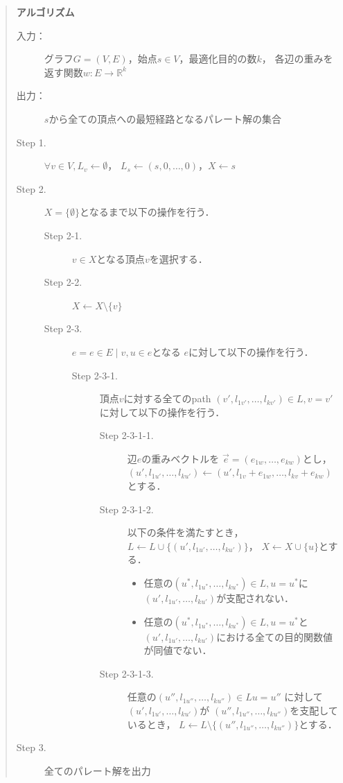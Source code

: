 \documentclass[12pt]{optlab-bachelor}
\begin{document}
\begin{quote}
  \textbf{アルゴリズム}
  \begin{description}
    \item[入力：] グラフ$G=(V,E)$，始点$s \in V$，最適化目的の数$k$，
    各辺の重みを返す関数$w : E \to \mathbb{R}^k$
    \item[出力：] $s$から全ての頂点への最短経路となるパレート解の集合
    \item[Step 1.] $\forall v \in V , L_v \leftarrow \emptyset$，
    $L_s \leftarrow (s,0,\ldots,0)$，$X \leftarrow s$
    \item[Step 2.] $X = \{\emptyset\}$となるまで以下の操作を行う．
    \begin{description}
      \item[Step 2-1.] $v \in X$となる頂点$v$を選択する．
      \item[Step 2-2.] $X \leftarrow X \setminus \{ v \}$
      \item[Step 2-3.] $e = {e \in E \mid v,u \in e}$となる
      $e$に対して以下の操作を行う．
      \begin{description}
        \item[Step 2-3-1.] 頂点$v$に対する全てのpath
        $(v',l_{1v'},\ldots,l_{kv'}) \in L,v=v'$に対して以下の操作を行う．
        \begin{description}
          \item[Step 2-3-1-1.] 辺$e$の重みベクトルを
          $\vec{e} = (e_{1w},\ldots,e_{kw})$とし，
          $(u',l_{1u'},\ldots,l_{ku'}) \leftarrow
          (u',l_{1v}+e_{1w},\ldots,l_{kv}+e_{kw})$とする．
          \item[Step 2-3-1-2.] 以下の条件を満たすとき，
          $L \leftarrow L \cup \{(u',l_{1u'},\ldots,l_{ku'})\}$，
          $X \leftarrow X \cup \{ u\}$とする．
          \begin{itemize}
            \item 任意の$(u^*,l_{1u^*},\ldots,l_{ku^*})\in L,u=u^*$に
            $(u',l_{1u'},\ldots,l_{ku'})$が支配されない．
            \item 任意の$(u^*,l_{1u^*},\ldots,l_{ku^*}) \in L,u=u^*$と
            $(u',l_{1u'},\ldots,l_{ku'})$における全ての目的関数値が同値でない．
          \end{itemize}
          \item[Step 2-3-1-3.] 任意の$(u'',l_{1u''},\ldots,l_{ku''})\in Lu=u''$
          に対して$(u',l_{1u'},\ldots,l_{ku'})$が
          $(u'',l_{1u''},\ldots,l_{ku''})$を支配しているとき，
          $L \leftarrow L \setminus \{(u'',l_{1u''},\ldots,l_{ku''})\}$とする．
        \end{description}
      \end{description}
    \end{description}
    \item[Step 3.] 全てのパレート解を出力
  \end{description}
\end{quote}
\end{document}
